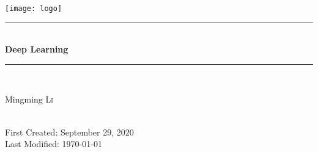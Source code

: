 
\begin{titlepage}

\newcommand{\HRule}{\rule{\linewidth}{0.5mm}} %

\center                         %
 

\texttt{[image: logo]}\\[1cm] %


\HRule\\[0.4cm]
{ \huge \bfseries Deep Learning}\\[0.4cm] %
\HRule\\[1.5cm]
 

\begin{minipage}{0.4\textwidth}
\begin{center} \large
Mingming \textsc{Li}\\ %
\end{center}

\end{minipage}\\[2cm]


\vfill
{\large First Created: September 29, 2020}\\
{\large Last Modified: \today}\\[2cm] %



\end{titlepage}

